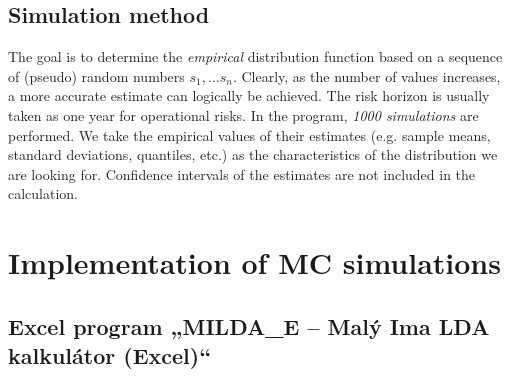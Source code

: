 \documentclass{article}
\begin{document}








\subsection{Simulation method}

The goal is to determine the \emph{empirical} distribution function based on a sequence of (pseudo) random numbers $s_1, \ldots s_n$. Clearly, as the number of values increases, a more accurate estimate can logically be achieved. The risk horizon is usually taken as one year for operational risks. In the program, \emph{1000 simulations} are performed. We take the empirical values of their estimates (e.g. sample means, standard deviations, quantiles, etc.) as the characteristics of the distribution we are looking for. Confidence intervals of the estimates are not included in the calculation.



\section{Implementation of MC simulations}


\subsection{Excel program „MILDA\_E – Malý Ima LDA kalkulátor (Excel)“}
\end{document}
